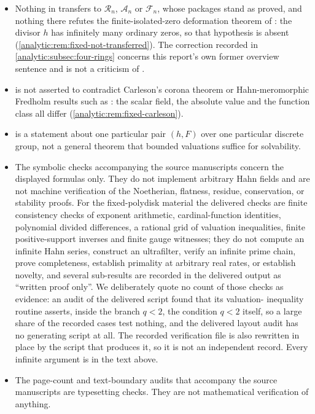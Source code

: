 \documentclass[11pt,letterpaper]{article}
\theoremstyle{definition}
\theoremstyle{remark}
\newcommand{\A}{\mathscr A}
\newcommand{\RR}{\mathscr R}
\newcommand{\FF}{\mathscr F}
\numberwithin{equation}{section}
\begin{document}
\begin{itemize}
\cref{analytic:def:fixed-gauge}.
\item Nothing in
transfers to $\RR_n$, $\A_n$ or $\FF_n$, whose packages stand as proved,
and nothing there refutes the finite-isolated-zero deformation theorem of
\cite{FiniteDeformations}: the divisor $h$ has infinitely many ordinary
zeros, so that hypothesis is absent
(\cref{analytic:rem:fixed-not-transferred}). The correction recorded in
\cref{analytic:subsec:four-rings} concerns this report's own former
overview sentence and is not a criticism of
\cite{FiniteDeformations}.
\item {} is not asserted to contradict
Carleson's corona theorem \cite{Carleson} or Hahn-meromorphic Fredholm
results such as \cite{MullerStrohmaier}: the scalar field, the absolute
value and the function class all differ
(\cref{analytic:rem:fixed-carleson}).
\item {} is a statement about one
particular pair $(h,F)$ over one particular discrete group, not a general
theorem that bounded valuations suffice for solvability.
\item The symbolic checks accompanying the source manuscripts concern the
displayed formulas only. They do not implement arbitrary Hahn fields and
are not machine verification of the Noetherian, flatness, residue,
conservation, or stability proofs. For the fixed-polydisk material the
delivered checks are finite consistency checks of exponent arithmetic,
cardinal-function identities, polynomial divided differences, a rational
grid of valuation inequalities, finite positive-support inverses and
finite gauge witnesses; they do not compute an infinite Hahn series,
construct an ultrafilter, verify an infinite prime chain, prove
completeness, establish primality at arbitrary real rates, or establish
novelty, and several sub-results are recorded in the delivered output as
``written proof only''. We deliberately quote no count of those checks as
evidence: an audit of the delivered script found that its valuation-%
inequality routine asserts, inside the branch $q<2$, the condition $q<2$
itself, so a large share of the recorded cases test nothing, and the
delivered layout audit has no generating script at all. The recorded
verification file is also rewritten in place by the script that produces
it, so it is not an independent record. Every infinite argument is in the
text above.
\item The page-count and text-boundary audits that accompany the source
manuscripts are typesetting checks. They are not mathematical
verification of anything.
\end{itemize}
\end{document}
